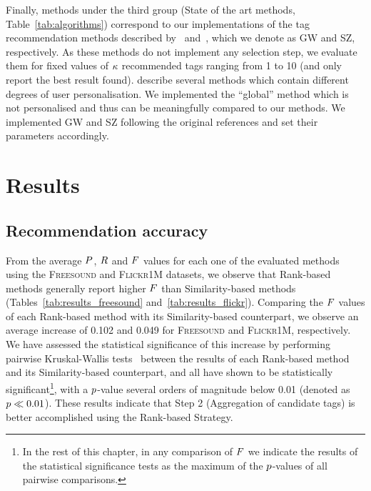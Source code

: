 Finally, methods under the third group (State of the art methods, Table~\ref{tab:algorithms}) correspond to our implementations of the tag recommendation methods described by~\cite{Garg2008} and~\cite{Sigurbjornsson2008}, which we denote as GW and SZ, respectively. As these methods do not implement any selection step, we evaluate them for fixed values of $\kappa$ recommended tags ranging from 1 to 10 (and only report the best result found). \cite{Garg2008} describe several methods which contain different degrees of user personalisation. We implemented the ``global'' method which is not personalised and thus can be meaningfully compared to our methods. We implemented GW and SZ following the original references and set their parameters accordingly. 

\section{Results}
\label{sec:general:results}

\subsection{Recommendation accuracy}

From the average $P$, $R$ and $F$ values for each one of the evaluated methods using the \textsc{Freesound} and \textsc{Flickr1M} datasets, we observe that Rank-based methods generally report higher $F$ than Similarity-based methods (Tables~\ref{tab:results_freesound} and~\ref{tab:results_flickr}). Comparing the $F$ values of each Rank-based method with its Similarity-based counterpart, we observe an average increase of 0.102 and 0.049 for \textsc{Freesound} and \textsc{Flickr1M}, respectively. We have assessed the statistical significance of this increase by performing pairwise Kruskal-Wallis tests~\citep{Corder2009} between the results of each Rank-based method and its Similarity-based counterpart, and all have shown to be statistically significant\footnote{In the rest of this chapter, in any comparison of $F$ we indicate the results of the statistical significance tests as the maximum of the $p$-values of all pairwise comparisons.}, with a $p$-value several orders of magnitude below 0.01 (denoted as $p\ll0.01$). These results indicate that Step 2 (Aggregation of candidate tags) is better accomplished using the Rank-based Strategy.

